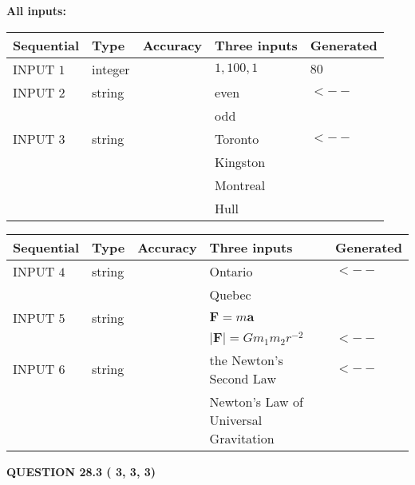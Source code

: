 \documentclass[12pt]{article}
\begin{document}
   
   
   
\noindent\vspace{0.1in}\hspace{-0.08in} {\textbf{\Large{All inputs: }}}
   
   
  
  
\noindent\begin{tabular}{|l|l|l|l|l|}
\hline
 Sequential & Type & Accuracy & Three inputs & Generated \\ 
\hline
 
 
  INPUT $           1$ & integer &  & $
 1
 , 
 100
 , 
 1
 $ & $ 80 $ 
 \\  \hline  
 
 
  INPUT $           2$ & string & & 
 even & 
  $ <-- $ 
  \\
  & & & 
 odd & 
 \\  \hline  
 
 
  INPUT $           3$ & string & & 
 Toronto & 
  $ <-- $ 
  \\
  & & & 
 Kingston & 
  \\
  & & & 
 Montreal & 
  \\
  & & & 
 Hull & 
 \\  \hline  
 \end{tabular}
   
   
  
  
\noindent\begin{tabular}{|l|l|l|l|l|}
\hline
 Sequential & Type & Accuracy & Three inputs & Generated \\ 
\hline
 
 
  INPUT $           4$ & string & & 
 Ontario & 
  $ <-- $ 
  \\
  & & & 
 Quebec & 
 \\  \hline  
 
 
  INPUT $           5$ & string & & 
 $\mathbf{F}=m\mathbf{a}$ & 
  \\
  & & & 
 $\left| \mathbf{F}\right| =Gm_1m_2r^{-2}$ & 
  $ <-- $ 
 \\  \hline  
 
 
  INPUT $           6$ & string & & 
 the Newton's Second Law & 
  $ <-- $ 
  \\
  & & & 
 Newton's Law of Universal Gravitation & 
 \\  \hline  
 \end{tabular}
   
   
  
\vspace{0.2in}
  
{\textbf{\Large{QUESTION
28.3 
 (          3,          3,          3)
}}}
  
\end{document}

